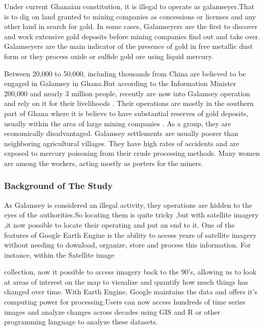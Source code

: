 \documentclass[
  letterpaper,
  DIV=11,
  numbers=noendperiod]{scrartcl}
\begin{document}
Under current Ghanaian constitution, it is illegal to operate as
galamseyer.That is to dig on land granted to mining companies as
concessions or licenses and any other land in search for gold. In some
cases, Galamseyers are the first to discover and work extensive gold
deposits before mining companies find out and take over. Galamseyers are
the main indicator of the presence of gold in free metallic dust form or
they process oxide or sulfide gold ore using liquid mercury.

Between 20,000 to 50,000, including thousands from China are believed to
be engaged in Galamsey in Ghana.But according to the Information
Minister 200,000 and nearly 3 million people, recently are now into
Galamsey operation and rely on it for their livelihoods \autocite[
]{goldgu2017}. Their operations are mostly in the southern part of Ghana
where it is believe to have substantial reserves of gold deposits,
usually within the area of large mining companies
\autocite{barenblitt2021} . As a group, they are economically
disadvantaged. Galamsey settlements are usually poorer than neighboring
agricultural villages. They have high rates of accidents and are exposed
to mercury poisoning from their crude processing methods. Many women are
among the workers, acting mostly as porters for the miners.

\hypertarget{background-of-the-study}{%
\subsubsection{Background of The Study}\label{background-of-the-study}}

As Galamsey is considered an illegal activity, they operations are
hidden to the eyes of the authorities.So locating them is quite tricky
,but with satellite imagery ,it now possible to locate their operating
and put an end to it. One of the features of Google Earth Engine is the
ability to access years of satellite imagery without needing to
download, organize, store and process this information. For instance,
within the Satellite image

collection, now it possible to access imagery back to the 90's, allowing
us to look at areas of interest on the map to visualize and quantify how
much things has changed over time. With Earth Engine, Google maintains
the data and offers it's computing power for processing.Users can now
access hundreds of time series images and analyze changes across decades
using GIS and R or other programming language to analyze these datasets.
\end{document}
